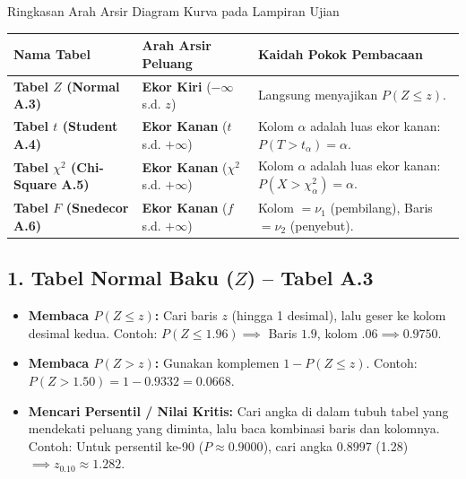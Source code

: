 \documentclass[10pt,twoside]{article}
\begin{document}
\begin{tipbox}{Ringkasan Arah Arsir Diagram Kurva pada Lampiran Ujian}
\begin{center}
\renewcommand{\arraystretch}{1.25}
\footnotesize\setlength{\tabcolsep}{2.5pt}
\begin{tabular}{p{3.2cm}p{3.6cm}p{6.8cm}}
\toprule
\textbf{Nama Tabel} & \textbf{Arah Arsir Peluang} & \textbf{Kaidah Pokok Pembacaan} \\
\midrule
\textbf{Tabel $Z$ (Normal A.3)} & \textbf{Ekor Kiri} ($-\infty$ s.d. $z$) & Langsung menyajikan $P(Z \le z)$. \\
\textbf{Tabel $t$ (Student A.4)} & \textbf{Ekor Kanan} ($t$ s.d. $+\infty$) & Kolom $\alpha$ adalah luas ekor kanan: $P(T > t_\alpha) = \alpha$. \\
\textbf{Tabel $\chi^2$ (Chi-Square A.5)} & \textbf{Ekor Kanan} ($\chi^2$ s.d. $+\infty$) & Kolom $\alpha$ adalah luas ekor kanan: $P(X > \chi^2_\alpha) = \alpha$. \\
\textbf{Tabel $F$ (Snedecor A.6)} & \textbf{Ekor Kanan} ($f$ s.d. $+\infty$) & Kolom $=\nu_1$ (pembilang), Baris $=\nu_2$ (penyebut). \\
\bottomrule
\end{tabular}
\end{center}
\end{tipbox}

\subsection{1. Tabel Normal Baku ($Z$) -- Tabel A.3}
\begin{itemize}
  \item \textbf{Membaca $P(Z \le z)$:} Cari baris $z$ (hingga 1 desimal), lalu geser ke kolom desimal kedua.
  Contoh: $P(Z \le 1.96) \implies$ Baris $1.9$, kolom $.06 \implies \mathbf{0.9750}$.
  \item \textbf{Membaca $P(Z > z)$:} Gunakan komplemen $1 - P(Z \le z)$.
  Contoh: $P(Z > 1.50) = 1 - 0.9332 = \mathbf{0.0668}$.
  \item \textbf{Mencari Persentil / Nilai Kritis:} Cari angka di dalam tubuh tabel yang mendekati peluang yang diminta, lalu baca kombinasi baris dan kolomnya.
  Contoh: Untuk persentil ke-90 ($P \approx 0.9000$), cari angka $0.8997$ (1.28) $\implies z_{0.10} \approx \mathbf{1.282}$.
\end{itemize}
\end{document}
